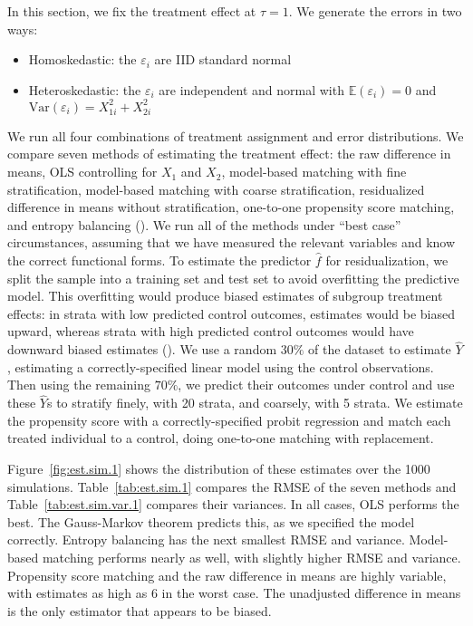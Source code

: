 \documentclass[12pt]{article}
\newcommand{\ex}{\mathbb{E}} %
\newcommand{\var}{\textrm{Var}}
\newcommand{\eps}{\varepsilon}
\begin{document}
\noindent In this section, we fix the treatment effect at $\tau = 1$.
We generate the errors in two ways:
\begin{itemize}
\item Homoskedastic: the $\eps_i$ are IID standard normal
\item Heteroskedastic: the $\eps_i$ are independent and normal with $\ex(\eps_i) = 0$ and $\var(\eps_i) = X_{1i}^2 + X_{2i}^2$
\end{itemize}
We run all four combinations of treatment assignment and error distributions.
We compare seven methods of estimating the treatment effect: the raw difference in means, OLS controlling for $X_1$ and $X_2$, model-based matching with fine stratification, model-based matching with coarse stratification, residualized difference in means without stratification, one-to-one propensity score matching, and entropy balancing (\citet{hainmueller_entropy_2012}).
We run all of the methods under ``best case'' circumstances, assuming that we  have measured the relevant variables and know the correct functional forms.
To estimate the predictor $\hat{f}$ for residualization, we split the sample into a training set and test set to avoid overfitting the predictive model.
This overfitting would produce biased estimates of subgroup treatment effects: in strata with low predicted control outcomes, estimates would be biased upward, whereas strata with high predicted control outcomes would have downward biased estimates (\cite{abadie_endogenous_2013}).
We use a random $30\%$ of the dataset to estimate $\hat{Y}$, estimating a correctly-specified linear model using the control observations.
Then using the remaining $70\%$, we predict their outcomes under control and use these $\hat{Y}$s to stratify finely, with 20 strata, and coarsely, with 5 strata.
We estimate the propensity score with a correctly-specified probit regression and match each treated individual to a control, doing one-to-one matching with replacement. 

Figure~\ref{fig:est.sim.1} shows the distribution of these estimates over the 1000 simulations.
Table~\ref{tab:est.sim.1} compares the RMSE of the seven methods and Table~\ref{tab:est.sim.var.1} compares their variances.
In all cases, OLS performs the best.
The Gauss-Markov theorem predicts this, as we specified the model correctly.
Entropy balancing has the next smallest RMSE and variance.
Model-based matching performs nearly as well, with slightly higher RMSE and variance.
Propensity score matching and the raw difference in means are highly variable, with estimates as high as $6$ in the worst case.
The unadjusted difference in means is the only estimator that appears to be biased.
\end{document}
